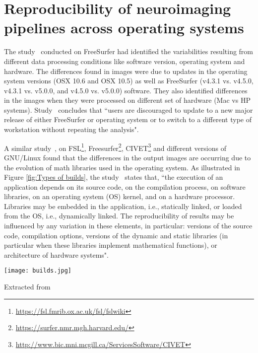 \section{Reproducibility of neuroimaging pipelines across operating systems}

The study~\cite{10.1371/journal.pone.0038234} conducted on FreeSurfer had identified the variabilities resulting from different data processing conditions like software version, operating system and hardware. The differences found in images were due to updates in the operating system versions (OSX 10.6 and OSX 10.5) as well as FreeSurfer (v4.3.1 vs. v4.5.0, v4.3.1 vs. v5.0.0, and v4.5.0 vs. v5.0.0) software. They also identified differences in the images when they were processed on different set of hardware (Mac vs HP systems). Study~\cite{10.1371/journal.pone.0038234} concludes that ``users are discouraged to update to a new major release of either FreeSurfer or operating system or to switch to a different type of workstation without repeating the analysis".

A similar study~\cite{Gla15}, on FSL\footnote{\url{https://fsl.fmrib.ox.ac.uk/fsl/fslwiki}}, Freesurfer\footnote{\url{https://surfer.nmr.mgh.harvard.edu/}}, CIVET\footnote{\url{http://www.bic.mni.mcgill.ca/ServicesSoftware/CIVET}} and different versions of GNU/Linux found that the differences in the output images are occurring due to the evolution of math libraries used in the operating system. As illustrated in Figure \ref{fig:Types of builds}, the study~\cite{Gla15} states that, ``the execution of an application depends on its source code, on the compilation process, on software libraries, on an operating system (OS) kernel, and on a hardware processor. Libraries may be embedded in the application, i.e., statically linked, or loaded from the OS, i.e., dynamically linked. The reproducibility of results may be influenced by any variation in these elements, in particular: versions of the source code, compilation options, versions of the dynamic and static libraries (in particular when these libraries implement mathematical functions), or architecture of hardware systems".

\begin{center}
\texttt{[image: builds.jpg]}
\label{fig:Types of builds}
\caption*{Extracted from \cite{Gla15}}
\end{center}

